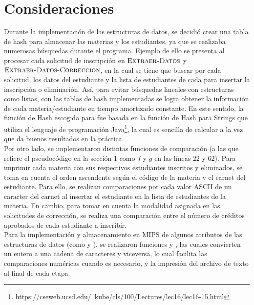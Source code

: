 \documentclass[11pt]{article}
\begin{document}
\section{Consideraciones}
Durante la implementación de las estructuras de datos, se decidió crear una tabla de hash para
almacenar las materias y los estudiantes, ya que se realizaba numerosas búsquedas durante el programa. 
Ejemplo de ello se presenta al procesar cada solicitud de inscripción en $\textnormal{\scshape Extraer-Datos}$
y $\textnormal{\scshape Extraer-Datos-Correccion}$, en la cual se tiene que buscar por cada solicitud, los datos
del estudiante y la lista de estudiantes de cada  para insertar la inscripción o eliminación. 
Así, para evitar búsquedas lineales con estructuras como listas, con las tablas de hash implementadas se logra 
obtener la información de cada materia/estudiante en tiempo amortizado constante. En este sentido, la función 
de Hash escogida para  fue basada en la función de Hash para Strings que utiliza el lenguaje 
de programación Java\footnote{https://cseweb.ucsd.edu/~kube/cls/100/Lectures/lec16/lec16-15.html}, la
cual es sencilla de calcular a la vez que da buenos resultados en la práctica. \\

Por otro lado, se implementaron distintas funciones de comparación (a las que refiere el pseudocódigo en
la sección 1 como $f$ y $g$ en las líneas 22 y 62). Para imprimir cada materia con sus
respectivos estudiantes inscritos y eliminados, se toma en cuenta el orden ascendente según el código
de la materia y el carnet del estudiante. Para ello, se realizan comparaciones por cada valor ASCII de 
un caracter del carnet al insertar el estudiante en la lista de estudiantes de la materia. 
En cambio, para tomar en cuenta la modalidad asignada en las solicitudes de corrección, se realiza una 
comparación entre el número de créditos aprobados de cada estudiante a inscribir. \\

Para la implementación y almacenamiento en MIPS de algunos atributos de las estructuras de datos
(como  y ), se realizaron funciones  y , las cuales
convierten un entero a una cadena de caracteres y viceversa, lo cual facilita las comparaciones
numéricas cuando es necesario, y la impresión del archivo de texto al final de cada etapa. \\
\end{document}
